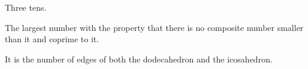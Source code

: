 Three tens.
\par
The largest number with the property that there is no 
composite number smaller than it and coprime to it.
\par
It is the number of edges of both the dodecahedron and
the icosahedron.

